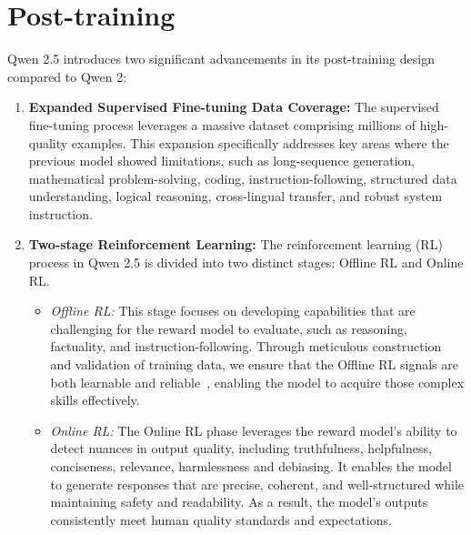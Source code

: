 \section{Post-training}

\label{sec:post}

Qwen 2.5 introduces two significant advancements in its post-training design compared to Qwen 2:

\begin{enumerate}[label=(\arabic*)]

    \item \textbf{Expanded Supervised Fine-tuning Data Coverage:} The supervised fine-tuning process leverages a massive dataset comprising millions of high-quality examples.
    This expansion specifically addresses key areas where the previous model showed limitations, such as long-sequence generation, mathematical problem-solving, coding, instruction-following, structured data understanding, logical reasoning, cross-lingual transfer, and robust system instruction.

    \item \textbf{Two-stage Reinforcement Learning:} The reinforcement learning (RL) process in Qwen 2.5 is divided into two distinct stages: Offline RL and Online RL. 

        \begin{itemize}

            \item \textit{Offline RL:} This stage focuses on developing capabilities that are challenging for the reward model to evaluate, such as reasoning, factuality, and instruction-following.
            Through meticulous construction and validation of training data, we ensure that the Offline RL signals are both learnable and reliable~\citep{xiang2024aligning}, enabling the model to acquire those complex skills effectively.
            
            \item \textit{Online RL:} The Online RL phase leverages the reward model's ability to detect nuances in output quality, including truthfulness, helpfulness, conciseness, relevance, harmlessness and debiasing. 
            It enables the model to generate responses that are precise, coherent, and well-structured while maintaining safety and readability. As a result, the model's outputs consistently meet human quality standards and expectations.

        \end{itemize}

\end{enumerate}




